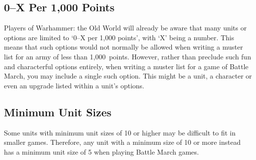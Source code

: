 \subsection{0--X Per 1,000 Points}

Players of Warhammer: the Old World will already be aware that many units or options are limited to `0--X per 1,000 points', with `X' being a number. This means that such options would not normally be allowed when writing a muster list for an army of less than 1,000~points. However, rather than preclude such fun and characterful options entirely, when writing a muster list for a game of Battle March, you may include a single such option. This might be a unit, a character or even an upgrade listed within a unit's options.

\subsection{Minimum Unit Sizes}

Some units with minimum unit sizes of 10 or higher may be difficult to fit in smaller games. Therefore, any unit with a minimum size of 10 or more instead has a minimum unit size of 5 when playing Battle March games.
